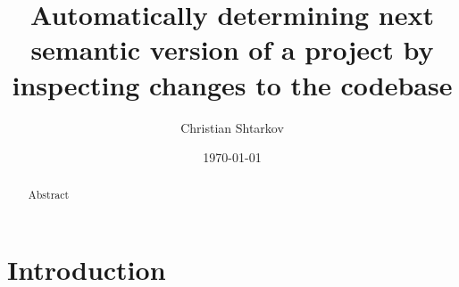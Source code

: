 \documentclass{l4proj}
\begin{document}
\title{Automatically determining next semantic version of a project by \\
  inspecting changes to the codebase}
\author{Christian Shtarkov}
\date{\today}
\maketitle

\begin{abstract}
Abstract
\end{abstract}

\educationalconsent

\tableofcontents

\chapter{Introduction}



\end{document}
